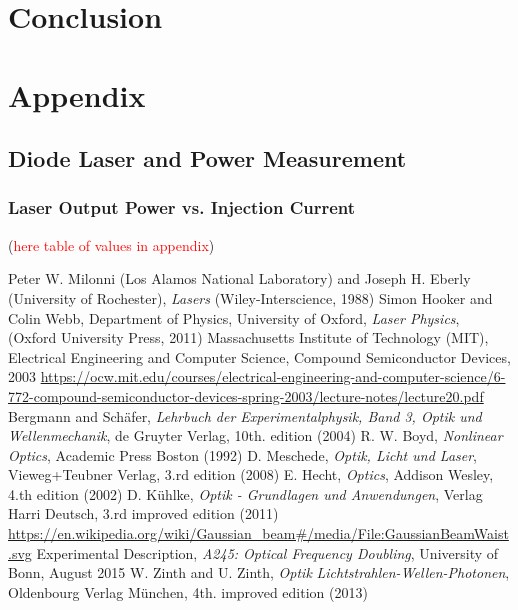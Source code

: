 \documentclass[10pt, a4paper, notitlepage, DIV=15]{scrartcl}
\begin{document}
\section{Conclusion}
\section{Appendix}
\subsection{Diode Laser and Power Measurement}
\subsubsection{Laser Output Power vs. Injection Current} \label{values_fun}  
(\textcolor{red}{here table of values in appendix})
\begin{thebibliography}{}
	Peter W. Milonni (Los Alamos National Laboratory) and Joseph H. Eberly (University of Rochester), \textit{Lasers} (Wiley-Interscience, 1988)
	Simon Hooker and Colin Webb, Department of Physics, University of Oxford, \textit{Laser Physics}, (Oxford University Press, 2011)
Massachusetts Institute of Technology (MIT), Electrical Engineering and Computer Science, Compound Semiconductor Devices, 2003 \url{https://ocw.mit.edu/courses/electrical-engineering-and-computer-science/6-772-compound-semiconductor-devices-spring-2003/lecture-notes/lecture20.pdf}
	Bergmann and Schäfer, \textit{Lehrbuch der Experimentalphysik, Band 3, Optik und Wellenmechanik}, de Gruyter Verlag, 10th. edition (2004)
	R. W. Boyd, \textit{Nonlinear Optics}, Academic Press Boston (1992)
D. Meschede, \textit{Optik, Licht und Laser}, Vieweg+Teubner Verlag, 3.rd edition (2008)
	E. Hecht, \textit{Optics}, Addison Wesley, 4.th edition (2002)
	D. Kühlke, \textit{Optik - Grundlagen und Anwendungen}, Verlag Harri Deutsch, 3.rd improved edition (2011)
	\url{https://en.wikipedia.org/wiki/Gaussian_beam#/media/File:GaussianBeamWaist.svg}
	Experimental Description, \textit{A245: Optical Frequency Doubling}, University of Bonn, August 2015
	W. Zinth and U. Zinth, \textit{Optik} \textit{Lichtstrahlen-Wellen-Photonen}, Oldenbourg Verlag München, 4th. improved edition (2013)
	

\end{thebibliography}
 
\end{document}
